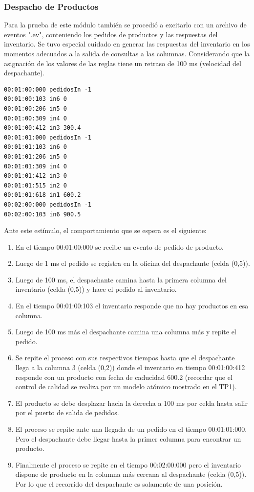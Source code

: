 \documentclass[10pt]{article}
\begin{document}
\subsubsection{Despacho de Productos}
Para la prueba de este módulo también se procedió a excitarlo con un archivo de eventos ".ev", conteniendo los pedidos de productos y las respuestas del inventario. Se tuvo especial cuidado en generar las respuestas del inventario en los momentos adecuados a la salida de consultas a las columnas. Considerando que la asignación de los valores de las reglas tiene un retraso de 100 ms (velocidad del despachante).

\begin{minipage}{1\textwidth}
	\centering
	\begin{lstlisting}
00:01:00:000 pedidosIn -1
00:01:00:103 in6 0
00:01:00:206 in5 0
00:01:00:309 in4 0
00:01:00:412 in3 300.4
00:01:01:000 pedidosIn -1
00:01:01:103 in6 0
00:01:01:206 in5 0
00:01:01:309 in4 0
00:01:01:412 in3 0
00:01:01:515 in2 0
00:01:01:618 in1 600.2
00:02:00:000 pedidosIn -1
00:02:00:103 in6 900.5
	\end{lstlisting}	
\end{minipage}

Ante este estímulo, el comportamiento que se espera es el siguiente:
\begin{enumerate}
	\item En el tiempo 00:01:00:000 se recibe un evento de pedido de producto.
	\item Luego de 1 ms el pedido se registra en la oficina del despachante (celda (0,5)).
	\item Luego de 100 ms, el despachante camina hasta la primera columna del inventario (celda (0,5)) y hace el pedido al inventario.
	\item En el tiempo 00:01:00:103 el inventario responde que no hay productos en esa columna.
	\item Luego de 100 ms más el despachante camina una columna más y repite el pedido.
	\item Se repite el proceso con sus respectivos tiempos hasta que el despachante llega a la columna 3 (celda (0,2)) donde el inventario en tiempo 00:01:00:412 responde con un producto con fecha de caducidad 600.2 (recordar que el control de calidad se realiza por un modelo atómico mostrado en el TP1).
	\item El producto se debe desplazar hacia la derecha a 100 ms por celda hasta salir por el puerto de salida de pedidos.
	\item El proceso se repite ante una llegada de un pedido en el tiempo 00:01:01:000. Pero el despachante debe llegar hasta la primer columna para encontrar un producto.
	\item Finalmente el proceso se repite en el tiempo 00:02:00:000 pero el inventario dispone de producto en la columna más cercana al despachante (celda (0,5)). Por lo que el recorrido del despachante es solamente de una posición.
\end{enumerate}
\end{document}
